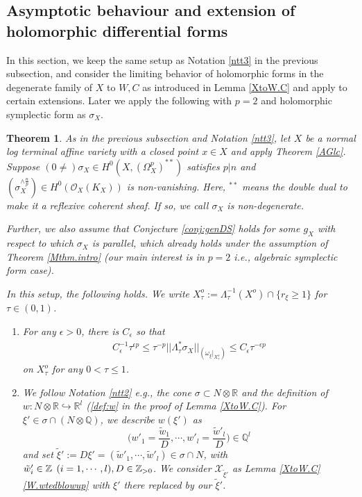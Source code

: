 \documentclass[12pt,a4paper]{amsart}
\newtheorem{Thm}{Theorem}[section]
\theoremstyle{remark}
\theoremstyle{definition}
\def\R{\mathbb{R}}
\def\Z{\mathbb{Z}}
\def\Q{\mathbb{Q}}
\begin{document}



\subsection{Asymptotic behaviour and extension of holomorphic differential forms}\label{subsec:extendtensor}

In this section, we keep the same setup as 
Notation \ref{ntt3} in the previous subsection,  
and 
consider the limiting behavior of holomorphic forms in the degenerate family of $X$ to $W, C$ as introduced in Lemma \ref{XtoW.C} and apply to certain extensions. 
Later we apply the following with $p=2$ and holomorphic symplectic form as $\sigma_X$. 
\begin{Thm}\label{thm:extendtoW}
As in the previous subsection and 
Notation \ref{ntt3}, 
let $X$ be a normal log terminal affine variety 
with a closed point $x\in X$ and apply Theorem \ref{AGlc}. Suppose $(0\neq)\sigma_X\in H^0(X,(\Omega_X^p)^{**})$ 
satisfies $p|n$ and $(\sigma_X^{\wedge \frac{n}{p}})\in H^0(\mathcal{O}_X(K_X))$ 
is non-vanishing. 
Here, ${}^{**}$ means the double dual to make it 
a reflexive coherent sheaf.  
If so, we call $\sigma_X$ is non-degenerate. 

Further, we also assume that 
Conjecture \ref{conj:genDS} holds for some $g_X$ with respect to 
which $\sigma_X$ is parallel, which already holds under the assumption of Theorem \ref{Mthm.intro} (our main interest is in $p=2$ i.e., algebraic 
symplectic form case). 

In this setup, the following holds. 
We write $X_\tau^o:=\Lambda_{\tau}^{-1}(X^o)\cap 
\{r_\xi\geq 1\}$ for $\tau\in (0,1)$. 
    \begin{enumerate}
    \item \label{est..tensor}
    For any $\epsilon>0$, there is $C_{\epsilon}$ 
    so that 
    \begin{align}\label{est.tensor}
    C_{\epsilon}^{-1}\tau^{\epsilon p}\le \tau^{-p}||\Lambda_\tau^*\sigma_X||_{(\omega_{\xi}|_{X^o_\tau})}
    \le C_{\epsilon}\tau^{-\epsilon p}
     \end{align}
    on $X^o_\tau$ for any $0<\tau\le 1$. 
    \item \label{extension}
    We follow Notation \ref{ntt2} e.g., the cone $\sigma\subset N\otimes \R$ and the definition of 
    $w\colon N\otimes \R\hookrightarrow \R^l$ (\eqref{def:w} in the proof of Lemma \ref{XtoW.C}). 
 For $\xi'\in \sigma\cap (N\otimes \Q)$, we describe $w(\xi')$ as $$\biggl(w'_1=\frac{\tilde{w}_1}{D},\cdots,w'_l=\frac{\tilde{w}'_l}{D}\biggr)\in \Q^l$$ and set $\tilde{\xi}':=D\xi'=(\tilde{w}'_1,\cdots,\tilde{w}'_l)\in \sigma\cap N$, with 
 $\tilde{w}'_i\in \Z \hspace{1.6mm} (i=1,\cdots,l), D\in \Z_{>0}$. 
    We consider $\mathcal{X}_{\tilde{\xi}'}$ as Lemma \ref{XtoW.C} \eqref{W.wtedblowup} with $\xi'$ there replaced by our $\tilde{\xi}'$. 
    

\end{enumerate}
\end{Thm}
\end{document}
